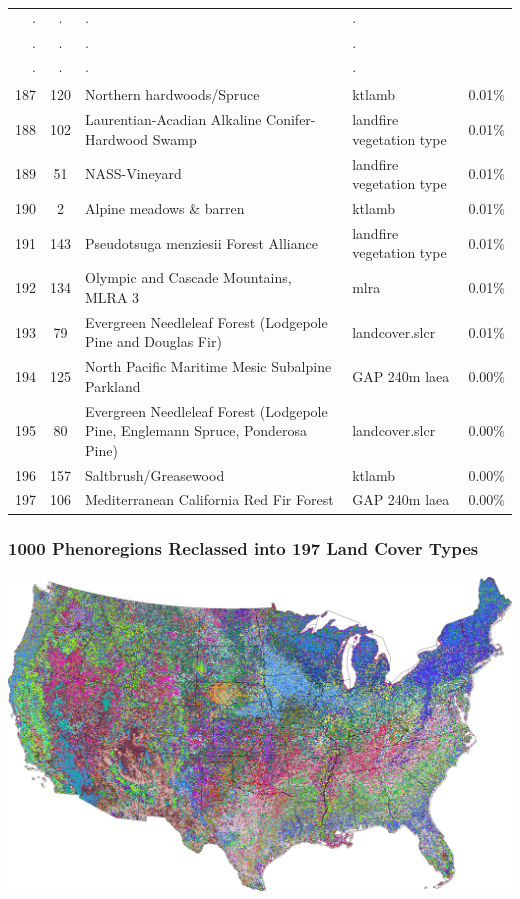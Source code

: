 \begin{frame}
\begin{tabular}{r c p{1.8in} l r}
$\cdot$ & $\cdot$ & $\cdot$ & $\cdot$ \\
$\cdot$ & $\cdot$ & $\cdot$ & $\cdot$ \\
$\cdot$ & $\cdot$ & $\cdot$ & $\cdot$ \\
187 & 120 & Northern hardwoods/Spruce & ktlamb & 0.01\% \\
188 & 102 & Laurentian-Acadian Alkaline Conifer-Hardwood Swamp & landfire vegetation type & 0.01\% \\
189 & 51 & NASS-Vineyard & landfire vegetation type & 0.01\% \\
190 & 2 & Alpine meadows \& barren & ktlamb & 0.01\% \\
191 & 143 & Pseudotsuga menziesii Forest Alliance & landfire vegetation type & 0.01\% \\
192 & 134 & Olympic and Cascade Mountains, MLRA 3 & mlra & 0.01\% \\
193 & 79 & Evergreen Needleleaf Forest (Lodgepole Pine and Douglas Fir) & landcover.slcr & 0.01\% \\
194 & 125 & North Pacific Maritime Mesic Subalpine Parkland & GAP 240m laea & 0.00\% \\
195 & 80 & Evergreen Needleleaf Forest (Lodgepole Pine, Englemann Spruce, Ponderosa Pine) & landcover.slcr & 0.00\% \\
196 & 157 & Saltbrush/Greasewood & ktlamb & 0.00\% \\
197 & 106 & Mediterranean California Red Fir Forest & GAP 240m laea & 0.00\% \\
 \end{tabular}
\end{frame}

\begin{frame}
 \frametitle{1000 Phenoregions Reclassed into 197 Land Cover Types}
 \includegraphics[width=\textwidth]{figures/phendump.2000-2012.1000.maxmode.reclassed_level2_gimp.pdf}
\end{frame}


